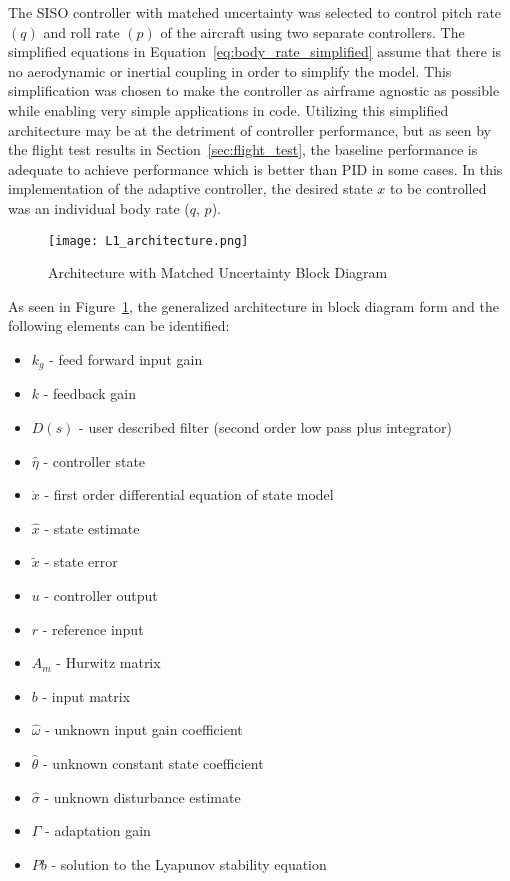 The \ac{SISO} controller with matched uncertainty was selected to control pitch rate $(q)$ and roll rate $(p)$ of the aircraft using two separate controllers.  The simplified equations in Equation~\ref{eq:body_rate_simplified} assume that there is no aerodynamic or inertial coupling in order to simplify the model.  This simplification was chosen to make the controller as airframe agnostic as possible while enabling very simple applications in code.  Utilizing this simplified architecture may be at the detriment of controller performance, but as seen by the flight test results in Section~\ref{sec:flight_test}, the baseline performance is adequate to achieve performance which is better than \ac{PID} in some cases.  In this implementation of the \Lone adaptive controller, the desired state $x$ to be controlled was an individual body rate (\eg $q$, $p$). 

\begin{figure}[h!]
 \centering
  \texttt{[image: L1\_architecture.png]}
  \caption{\Lone Architecture with Matched Uncertainty Block Diagram \cite{hovakimyan2010l1} }
  \label{fig:l1_architecture}
\end{figure}

As seen in Figure~\ref{fig:l1_architecture}, the generalized \Lone architecture in block diagram form and the following elements can be identified:
\begin{itemize}
 \item[] $k_g$ - feed forward input gain
 \item[] $k$ - feedback gain
 \item[] $D(s)$ - user described filter (second order low pass plus integrator)
 \item[] $\hat{\eta}$ - \Lone controller state
 \item[] $\dot{x}$ - first order differential equation of state model
 \item[] $\hat{x}$ - state estimate
 \item[] $\tilde{x}$ - state error
 \item[] $u$ - controller output
 \item[] $r$ - reference input
 \item[] $A_m$ - Hurwitz matrix
 \item[] $b$ - input matrix
 \item[] $\hat{\omega}$ - unknown input gain coefficient
 \item[] $\hat{\theta}$ - unknown constant state coefficient
 \item[] $\hat{\sigma}$ - unknown disturbance estimate
 \item[] $\Gamma$ - adaptation gain
 \item[] $Pb$ - solution to the Lyapunov stability equation 
\end{itemize}

